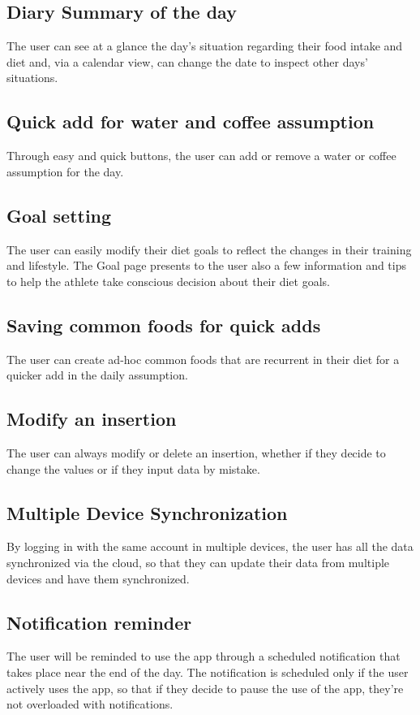\documentclass{Configuration_Files/PoliMi3i_thesis}
\begin{document}
\subsection{Diary Summary of the day}
The user can see at a glance the day's situation regarding their food intake and diet and, via a calendar view, can change the date to inspect other days' situations. 
\subsection{Quick add for water and coffee assumption}
Through easy and quick buttons, the user can add or remove a water or coffee assumption for the day. 
\subsection{Goal setting}
The user can easily modify their diet goals to reflect the changes in their training and lifestyle. The Goal page presents to the user also a few information and tips to help the athlete take conscious decision about their diet goals. 
\subsection{Saving common foods for quick adds}
The user can create ad-hoc common foods that are recurrent in their diet for a quicker add in the daily assumption. 
\subsection{Modify an insertion}
The user can always modify or delete an insertion, whether if they decide to change the values or if they input data by mistake. 
\subsection{Multiple Device Synchronization}
By logging in with the same account in multiple devices, the user has all the data synchronized via the cloud, so that they can update their data from multiple devices and have them synchronized.
\subsection{Notification reminder}
The user will be reminded to use the app through a scheduled notification that takes place near the end of the day. The notification is scheduled only if the user actively uses the app, so that if they decide to pause the use of the app, they're not overloaded with notifications.
\end{document}
